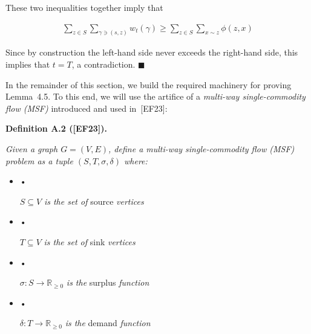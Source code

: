 \documentclass[10pt,a4paper]{article}
\begin{document}
These two inequalities together imply that\par


\[\begin{gathered}
\sum_{z\in S}\sum_{\gamma\ni(s,z)}w_{t}(\gamma)\geq\sum_{z\in S}\sum_{x\sim z}\phi(z,x)
\end{gathered}\]


Since by construction the left-hand side never exceeds the right-hand side, this
implies that $t=T$, a contradiction.
\ensuremath{\blacksquare}\par





In the remainder of this section, we build the required machinery for proving Lemma 4.5.
To this end, we will use the artifice of a \emph{multi-way single-commodity flow (MSF)} introduced and used in [EF23]:\par





\par\medskip\noindent\textbf{\textbf{Definition A.2}\textbf{ }([EF23])\textbf{.}}\par



\emph{Given a graph $G=(V,E)$, define a multi-way single-commodity flow (MSF) problem as a tuple
$(S,T,\sigma,\delta)$
where:}\par


\begin{itemize}


\item[] • 


$S\subseteq V$\emph{ is the set of }source\emph{ vertices}\par




\item[] • 


$T\subseteq V$\emph{ is the set of }sink\emph{ vertices}\par




\item[] • 


$\sigma:S\rightarrow\mathbb{R}_{\geq 0}$\emph{ is the }surplus\emph{ function}\par




\item[] • 


$\delta:T\rightarrow\mathbb{R}_{\geq 0}$\emph{ is the }demand\emph{ function}\par




\end{itemize}
\end{document}
